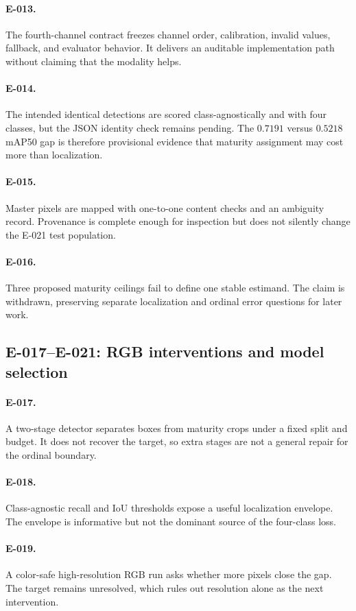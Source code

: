\documentclass[preprint,12pt]{elsarticle}
\begin{document}
\paragraph{E-013.} The fourth-channel contract freezes channel order,
calibration, invalid values, fallback, and evaluator behavior. It delivers an
auditable implementation path without claiming that the modality helps.
\paragraph{E-014.} The intended identical detections are scored
class-agnostically and with four classes, but the JSON identity check remains
pending. The \(0.7191\) versus \(0.5218\) mAP50 gap is therefore provisional
evidence that maturity assignment may cost more than localization.
\paragraph{E-015.} Master pixels are mapped with one-to-one content checks and
an ambiguity record. Provenance is complete enough for inspection but does
not silently change the E-021 test population.
\paragraph{E-016.} Three proposed maturity ceilings fail to define one stable
estimand. The claim is withdrawn, preserving separate localization and
ordinal error questions for later work.

\subsection{E-017--E-021: RGB interventions and model selection}
\paragraph{E-017.} A two-stage detector separates boxes from maturity crops
under a fixed split and budget. It does not recover the target, so extra
stages are not a general repair for the ordinal boundary.
\paragraph{E-018.} Class-agnostic recall and IoU thresholds expose a useful
localization envelope. The envelope is informative but not the dominant
source of the four-class loss.
\paragraph{E-019.} A color-safe high-resolution RGB run asks whether more
pixels close the gap. The target remains unresolved, which rules out
resolution alone as the next intervention.
\end{document}
